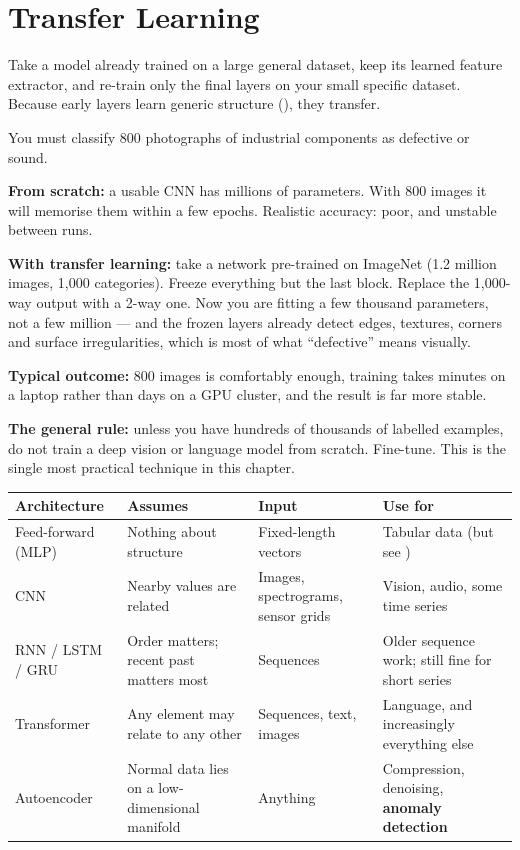 \section{Transfer Learning}

\begin{definitionbox}
Take a model already trained on a large general dataset, keep its learned feature
extractor, and re-train only the final layers on your small specific dataset.
Because early layers learn generic structure (), they transfer.
\end{definitionbox}

\begin{worked}
You must classify 800 photographs of industrial components as defective or sound.

\smallskip
\textbf{From scratch:} a usable CNN has millions of parameters. With 800 images it
will memorise them within a few epochs. Realistic accuracy: poor, and unstable
between runs.

\textbf{With transfer learning:} take a network pre-trained on ImageNet (1.2 million
images, 1{,}000 categories). Freeze everything but the last block. Replace the
1{,}000-way output with a 2-way one. Now you are fitting a few thousand parameters,
not a few million --- and the frozen layers already detect edges, textures, corners
and surface irregularities, which is most of what ``defective'' means visually.

\smallskip
\textbf{Typical outcome:} 800 images is comfortably enough, training takes minutes
on a laptop rather than days on a GPU cluster, and the result is far more stable.

\textbf{The general rule:} unless you have hundreds of thousands of labelled
examples, do not train a deep vision or language model from scratch. Fine-tune.
This is the single most practical technique in this chapter.
\end{worked}

\begin{longtable}{@{}L{2.9cm}L{4.0cm}L{3.4cm}L{4.0cm}@{}}
\toprule
{}
\textbf{Architecture} & \textbf{Assumes} & \textbf{Input} & \textbf{Use for} \\
\midrule
\endhead
Feed-forward (MLP) & Nothing about structure & Fixed-length vectors & Tabular data (but see ) \\
CNN & Nearby values are related & Images, spectrograms, sensor grids & Vision, audio, some time series \\
RNN / LSTM / GRU & Order matters; recent past matters most & Sequences & Older sequence work; still fine for short series \\
Transformer & Any element may relate to any other & Sequences, text, images & Language, and increasingly everything else \\
Autoencoder & Normal data lies on a low-dimensional manifold & Anything & Compression, denoising, \textbf{anomaly detection} \\
\bottomrule
\end{longtable}

